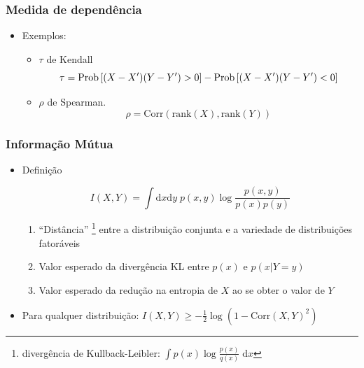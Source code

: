 \documentclass[ignorenonframetext,]{beamer}
\begin{document}
\begin{frame}\frametitle{Medida de dependência}

\begin{itemize}
\itemsep1pt\parskip0pt
\item
  Exemplos:

  \begin{itemize}
  \itemsep1pt\parskip0pt
  \item
    $\tau$ de Kendall
    \[\small\tau = \mathrm{Prob}\left[(X - X')(Y-Y') > 0\right] - \mathrm{Prob}\left[(X - X')(Y-Y') < 0\right]\]
  \item
    $\rho$ de Spearman.
    \[\rho = \mathrm{Corr}(\mathrm{rank}(X), \mathrm{rank}(Y))\]
  \end{itemize}
\end{itemize}

\end{frame}

\begin{frame}\frametitle{Informação Mútua}

\begin{itemize}
\item
  Definição

  \[I(X,Y) = \int \mathrm{d}x\mathrm{d}y\; p(x,y) \log\frac{p(x,y)}{p(x)p(y)}\]

  \begin{enumerate}
  \def\labelenumi{\arabic{enumi}.}
  \itemsep1pt\parskip0pt
  \item
    ``Distância''
    \footnote{divergência de Kullback-Leibler: $\int p(x)\log\frac{p(x)}{q(x)} \;\mathrm{d}x$}
    entre a distribuição conjunta e a variedade de distribuições
    fatoráveis
  \item
    Valor esperado da divergência KL entre $p(x)$ e $p(x\vert Y = y)$
  \item
    Valor esperado da redução na entropia de $X$ ao se obter o valor de
    $Y$
  \end{enumerate}
\item
  Para qualquer distribuição:
  $I(X,Y) \ge -\frac{1}{2} \log(1 - \mathrm{Corr}(X,Y)^2)$
\end{itemize}

\end{frame}
\end{document}
